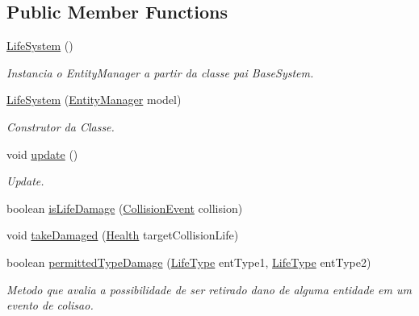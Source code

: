 \subsection*{Public Member Functions}
\begin{DoxyCompactItemize}
\item 
\hyperlink{classbr_1_1unb_1_1unbomber_1_1systems_1_1_life_system_a59a5d0f16643f9ac2a19fef6cfd62b42}{Life\+System} ()
\begin{DoxyCompactList}\small\item\em Instancia o Entity\+Manager a partir da classe pai Base\+System. \end{DoxyCompactList}\item 
\hyperlink{classbr_1_1unb_1_1unbomber_1_1systems_1_1_life_system_a4c65f6e17a754612781366c618825f5d}{Life\+System} (\hyperlink{interfacebr_1_1unb_1_1unbomber_1_1core_1_1_entity_manager}{Entity\+Manager} model)
\begin{DoxyCompactList}\small\item\em Construtor da Classe. \end{DoxyCompactList}\item 
void \hyperlink{classbr_1_1unb_1_1unbomber_1_1systems_1_1_life_system_add7a0f79e5f256407ba1d14cf5fc8610}{update} ()
\begin{DoxyCompactList}\small\item\em Update. \end{DoxyCompactList}\item 
boolean \hyperlink{classbr_1_1unb_1_1unbomber_1_1systems_1_1_life_system_ac4644a67be6412b93fc47700e8c5e629}{is\+Life\+Damage} (\hyperlink{classbr_1_1unb_1_1unbomber_1_1event_1_1_collision_event}{Collision\+Event} collision)
\item 
void \hyperlink{classbr_1_1unb_1_1unbomber_1_1systems_1_1_life_system_a3d84ab6ee592745e577494c07146369a}{take\+Damaged} (\hyperlink{classbr_1_1unb_1_1unbomber_1_1component_1_1_health}{Health} target\+Collision\+Life)
\item 
boolean \hyperlink{classbr_1_1unb_1_1unbomber_1_1systems_1_1_life_system_a62ea7abe8df87807153ec47dd0ca5955}{permitted\+Type\+Damage} (\hyperlink{classbr_1_1unb_1_1unbomber_1_1component_1_1_life_type}{Life\+Type} ent\+Type1, \hyperlink{classbr_1_1unb_1_1unbomber_1_1component_1_1_life_type}{Life\+Type} ent\+Type2)
\begin{DoxyCompactList}\small\item\em Metodo que avalia a possibilidade de ser retirado dano de alguma entidade em um evento de colisao. \end{DoxyCompactList}\item 

\end{DoxyCompactItemize}
